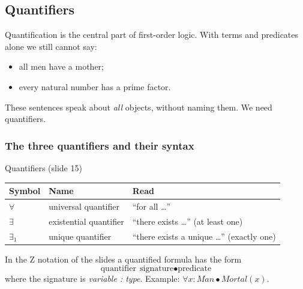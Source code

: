 \subsection{Quantifiers}
\label{sec:quantifiers}

Quantification is the central part of first-order logic. With terms and predicates alone
we still cannot say:
\begin{itemize}[nosep]
  \item all men have a mother;
  \item every natural number has a prime factor.
\end{itemize}
These sentences speak about \emph{all} objects, without naming them. We need quantifiers.

\subsubsection{The three quantifiers and their syntax}

\begin{nbdef}{Quantifiers (slide 15)}
\begin{center}
\begin{tabular}{@{}lll@{}}
\toprule
\textbf{Symbol} & \textbf{Name} & \textbf{Read} \\
\midrule
$\forall$ & universal quantifier & ``for all \ldots'' \\
$\exists$ & existential quantifier & ``there exists \ldots'' (at least one) \\
$\exists_1$ & unique quantifier & ``there exists a unique \ldots'' (exactly one) \\
\bottomrule
\end{tabular}
\end{center}
In the Z notation of the slides a quantified formula has the form
\[ \text{quantifier}\ \ \text{signature} \bullet \text{predicate} \]
where the signature is \emph{variable : type}. Example: $\forall x : \mathit{Man} \bullet
\mathit{Mortal}(x)$.
\end{nbdef}

